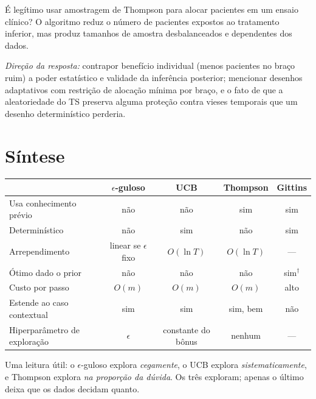 \documentclass[11pt, a4paper]{article}
\begin{document}
\begin{discbox}
É legítimo usar amostragem de Thompson para alocar pacientes em um ensaio
clínico? O algoritmo reduz o número de pacientes expostos ao tratamento
inferior, mas produz tamanhos de amostra desbalanceados e dependentes dos dados.

\smallskip
{\footnotesize\color{rlCinza}\emph{Direção da resposta:} contrapor benefício
individual (menos pacientes no braço ruim) a poder estatístico e validade da
inferência posterior; mencionar desenhos adaptativos com restrição de alocação
mínima por braço, e o fato de que a aleatoriedade do TS preserva alguma
proteção contra vieses temporais que um desenho determinístico perderia.}
\end{discbox}

\section{Síntese}

\begin{center}\small
\begin{tabular}{@{}lcccc@{}}
\toprule
 & $\epsilon$\textbf{-guloso} & \textbf{UCB} & \textbf{Thompson} & \textbf{Gittins} \\
\midrule
Usa conhecimento prévio        & não & não & sim & sim \\
Determinístico                 & não & sim & não & sim \\
Arrependimento                 & linear se $\epsilon$ fixo & $O(\ln T)$ & $O(\ln T)$ & --- \\
Ótimo dado o prior             & não & não & não & sim$^{\dagger}$ \\
Custo por passo                & $O(m)$ & $O(m)$ & $O(m)$ & alto \\
Estende ao caso contextual     & sim & sim & sim, bem & não \\
Hiperparâmetro de exploração   & $\epsilon$ & constante do bônus & nenhum & --- \\
\bottomrule
\end{tabular}
\end{center}


\medskip
\noindent
Uma leitura útil: o $\epsilon$-guloso explora \emph{cegamente}, o UCB explora
\emph{sistematicamente}, e Thompson explora \emph{na proporção da dúvida}. Os
três exploram; apenas o último deixa que os dados decidam quanto.
\end{document}
